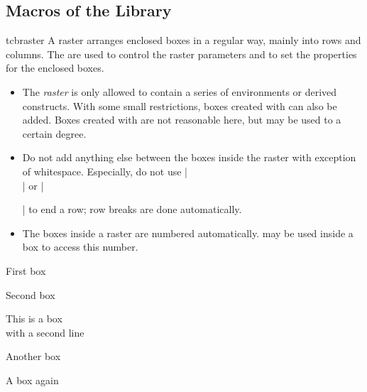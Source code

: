 
\bigskip
{\tcbuselistingtext}

\clearpage
\subsection{Macros of the Library}\label{subsec:raster_macros}

\begin{docEnvironment}[doc new=2014-11-10]{tcbraster}{}
A raster arranges enclosed boxes in a regular way, mainly into rows and
columns. The  are used to control the raster
parameters and to set the properties for the enclosed boxes.
\begin{itemize}
\item The \emph{raster} is only allowed to contain a series of
   environments or derived constructs.
  With some small restrictions, boxes created with  can also be added.
  Boxes created with  are not reasonable here, but may be
  used to a certain degree.
\item Do not add anything else between the boxes inside the raster with
  exception of white\-space. Especially, do not use |\\| or |\par| to end
  a row; row breaks are done automatically.
\item The boxes inside a raster are numbered automatically.
   may be used inside a box to access
  this number.
\end{itemize}

\begin{dispExample}
\begin{tcbraster}[raster columns=3, raster equal height,
  size=small,colframe=red!50!black,colback=red!10!white,colbacktitle=red!50!white,
  title={Box \# \thetcbrasternum}]
  \begin{tcolorbox}First box\end{tcolorbox}
  \begin{tcolorbox}Second box\end{tcolorbox}
  \begin{tcolorbox}This is a box\\with a second line\end{tcolorbox}
  \begin{tcolorbox}Another box\end{tcolorbox}
  \begin{tcolorbox}A box again\end{tcolorbox}
\end{tcbraster}
\end{dispExample}


\end{docEnvironment}

